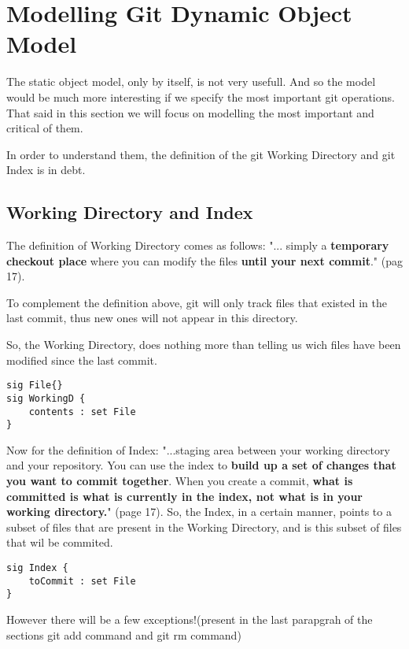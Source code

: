 \section {Modelling Git Dynamic Object Model}
The static object model, only by itself, 
is not very usefull. And so
the model would be much more interesting if we specify 
the most important git operations. That said in this
section we will focus on modelling the most important
and critical of them. \par

In order to understand them, the definition
of the git Working Directory and git Index is in debt.

\subsection{Working Directory and Index}

The definition of Working Directory comes as follows:
"... simply a {\bf temporary checkout place} where you can 
modify the files {\bf until your next commit}."
\cite{gitComm} (pag 17). \par

To complement the definition above, git will only
track files that existed in the last commit, thus
new ones will not appear in this directory. \par 
So,
the Working Directory, does nothing more than telling
us wich files have been modified since the last commit.

\begin{lstlisting}
sig File{}
sig WorkingD {
	contents : set File
}
\end{lstlisting}

Now for the definition of Index:
"...staging area between your working directory and your
repository. You can use the index to {\bf build up a set of 
changes that you want to commit together}. When you create
a commit, {\bf what is committed is what is currently in the
index, not what is in your working directory.}"
\cite{gitComm} (page 17). So, the Index, in a certain
manner, points to a subset
of files that are present in the Working Directory, and
is this subset of files that wil be commited. 

\begin{lstlisting}
sig Index {
	toCommit : set File
}
\end{lstlisting}

However
there will be a few exceptions!(present in the last parapgrah of the sections
git add command and git rm command)\par

